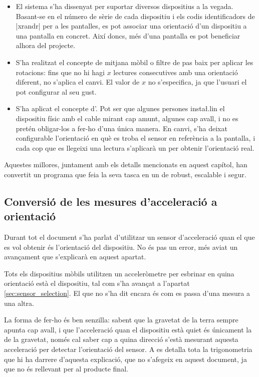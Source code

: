 \begin{itemize}
    \item El sistema s'ha dissenyat per suportar diversos dispositius a la
    vegada. Basant-se en el número de sèrie de cada dispositiu i els codis
    identificadors de \ord|xrandr| per a les pantalles, es pot associar una
    orientació d'un dispositiu a una pantalla en concret. Així doncs, més
    d'una pantalla es pot beneficiar alhora del projecte.
    \item S'ha realitzat el concepte de mitjana mòbil o filtre de pas baix per
    aplicar les rotacions: fins que no hi hagi $x$ lectures consecutives amb
    una orientació diferent, no s'aplica el canvi. El valor de $x$ no
    s'especifica, ja que l'usuari el pot configurar al seu gust.
    \item S'ha aplicat el concepte d'. Pot ser que algunes persones
    insta\l.lin el dispositiu físic amb el cable mirant cap amunt, algunes cap
    avall, i no es pretén obligar-los a fer-ho d'una única manera. En canvi,
    s'ha deixat configurable l'orientació en què es troba el sensor en
    referència a la pantalla, i cada cop que es llegeixi una lectura s'aplicarà
    un  per obtenir l'orientació real.
\end{itemize}

Aquestes millores, juntament amb els detalls mencionats en aquest capítol, han
convertit un programa que feia la seva tasca en un de robust, escalable i segur.

\subsection{Conversió de les mesures d'acceleració a orientació}

Durant tot el document s'ha parlat d'utilitzar un sensor d'acceleració quan el
que es vol obtenir és l'orientació del dispositiu. No és pas un error, més aviat
un avançament que s'explicarà en aquest apartat.

Tots els dispositius mòbils utilitzen un acceleròmetre per esbrinar en quina
orientació està el dispositiu, tal com s'ha avançat a l'apartat
\ref{sec:sensor_selection}. El que no s'ha dit encara és com es passa d'una
mesura a una altra.

La forma de fer-ho és ben senzilla: sabent que la gravetat de la terra sempre
apunta cap avall, i que l'acceleració quan el dispositiu està quiet és únicament
la de la gravetat, només cal saber cap a quina direcció s'està mesurant aquesta
acceleració per detectar l'orientació del sensor. A \cite{PedleyTilt} es
detalla tota la
trigonometria que hi ha darrere d'aquesta explicació, que no s'afegeix en aquest
document, ja que no és rellevant per al producte final.

